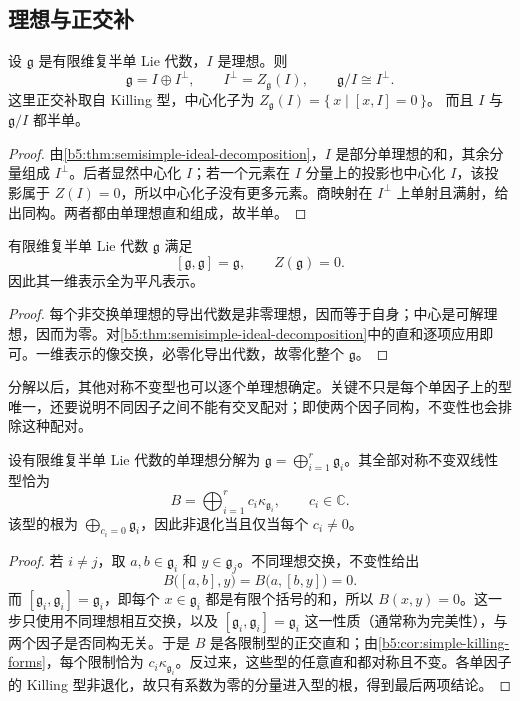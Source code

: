 \subsection{理想与正交补}
\label{b5:subsec:1303:02}

\begin{corollary}\label{b5:cor:semisimple-ideal-complement}
	设 \(\mathfrak g\) 是有限维复半单 Lie 代数，\(I\) 是理想。则
	\[
		\mathfrak g=I\oplus I^\perp,\qquad I^\perp=Z_{\mathfrak g}(I),\qquad \mathfrak g/I\cong I^\perp.
	\]
	这里正交补取自 Killing 型，中心化子为 \(Z_{\mathfrak g}(I)=\bigl\{\,x\mid[x,I]=0\,\bigr\}\)。 而且 \(I\) 与 \(\mathfrak g/I\) 都半单。
\end{corollary}
\begin{proof}
	由\cref{b5:thm:semisimple-ideal-decomposition}，\(I\) 是部分单理想的和，其余分量组成 \(I^\perp\)。后者显然中心化 \(I\)；若一个元素在 \(I\) 分量上的投影也中心化 \(I\)，该投影属于 \(Z(I)=0\)，所以中心化子没有更多元素。商映射在 \(I^\perp\) 上单射且满射，给出同构。两者都由单理想直和组成，故半单。
\end{proof}

\begin{corollary}\label{b5:cor:semisimple-perfect}
	有限维复半单 Lie 代数 \(\mathfrak g\) 满足
	\[
		[\mathfrak g,\mathfrak g]=\mathfrak g,\qquad Z(\mathfrak g)=0.
	\]
	因此其一维表示全为平凡表示。
\end{corollary}
\begin{proof}
	每个非交换单理想的导出代数是非零理想，因而等于自身；中心是可解理想，因而为零。对\cref{b5:thm:semisimple-ideal-decomposition}中的直和逐项应用即可。一维表示的像交换，必零化导出代数，故零化整个 \(\mathfrak g\)。
\end{proof}

分解以后，其他对称不变型也可以逐个单理想确定。关键不只是每个单因子上的型唯一，还要说明不同因子之间不能有交叉配对；即使两个因子同构，不变性也会排除这种配对。

\begin{proposition}\label{b5:prop:semisimple-invariant-forms}
	设有限维复半单 Lie 代数的单理想分解为 \(\mathfrak g=\bigoplus_{i=1}^r\mathfrak g_i\)。其全部对称不变双线性型恰为
	\[
		B=\bigoplus_{i=1}^r c_i\kappa_{\mathfrak g_i},\qquad c_i\in\mathbb C.
	\]
	该型的根为 \(\bigoplus_{c_i=0}\mathfrak g_i\)，因此非退化当且仅当每个 \(c_i\ne0\)。
\end{proposition}
\begin{proof}
	若 \(i\ne j\)，取 \(a,b\in\mathfrak g_i\) 和 \(y\in\mathfrak g_j\)。不同理想交换，不变性给出
	\[
		B\bigl([a,b],y\bigr)=B\bigl(a,[b,y]\bigr)=0.
	\]
	而 \([\mathfrak g_i,\mathfrak g_i]=\mathfrak g_i\)，即每个 \(x\in\mathfrak g_i\) 都是有限个括号的和，所以 \(B(x,y)=0\)。这一步只使用不同理想相互交换，以及 \([\mathfrak g_i,\mathfrak g_i]=\mathfrak g_i\) 这一性质（通常称为完美性），与两个因子是否同构无关。于是 \(B\) 是各限制型的正交直和；由\cref{b5:cor:simple-killing-forms}，每个限制恰为 \(c_i\kappa_{\mathfrak g_i}\)。反过来，这些型的任意直和都对称且不变。各单因子的 Killing 型非退化，故只有系数为零的分量进入型的根，得到最后两项结论。
\end{proof}

